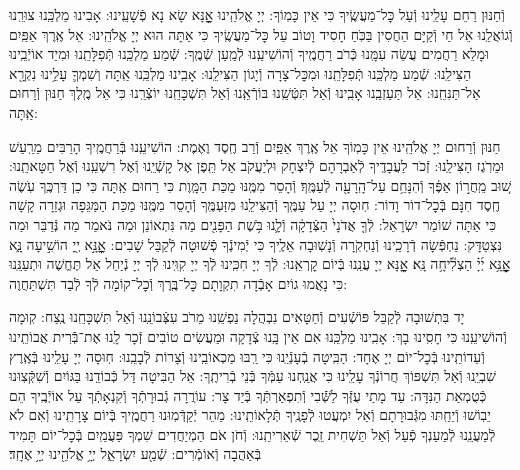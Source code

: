 \documentclass[twoside, openany, parskip=half, 11pt]{book}
\begin{document}
וְֿחַנּוּן רַחֵם עָלֵֽינוּ וְֿעַל כׇּל־מַעֲשֶֽׂיךָ כִּי אֵין כָּמֽוֹךָ: יְיָ אֱלֹהֵֽינוּ אׇׇׇׇָנָּא שָׂא נָא פְֿשָׁעֵֽינוּ: אָבִינוּ מַלְכֵּֽנוּ צוּרֵֽנוּ וְֿגוֹאֲלֵֽנוּ אֵל חַי וְֿקַיָּם הַחֲסִין בַּכֹּֽחַ חָסִיד וָטוֹב עַל כׇּל־מַעֲשֶֽׂיךָ כִּי אַתָּה הוּא יְיָ אֱלֹהֵֽינוּ: אֵל אֶֽרֶךְ אַפַּֽיִם וּמָלֵא רַחֲמִים עֲשֵׂה עִמָּֽנוּ כְּֿרֹב רַחֲמֶֽיךָ וְֿהוֹשִׁיעֵֽנוּ לְֿמַֽעַן שְֿׁמֶֽךָ: שְֿׁמַע מַלְכֵּֽנוּ תְּֿפִלָּתֵֽנוּ וּמִיַד אוֹיְֿבֵֽינוּ הַצִּילֵֽנוּ: שְֿׁמַע מַלְכֵּֽנוּ תְּֿפִלָּתֵֽנוּ וּמִכׇּל־צָרָה וְֿיָגוֹן הַצִּילֵֽנוּ: אָבִֽינוּ מַלְכֵּֽנוּ אַֽתָּה וְשִׁמְךָ֛ עָלֵ֥ינוּ נִקְרָ֖א אַל־תַּנִּחֵֽנוּ: אַל תַּעַזְבֵֽנוּ אָבִֽינוּ וְֿאַל תִּטְּֿשֵֽׁנוּ בּוֹרְֿאֵֽנוּ וְֿאַל תִּשְׁכָּחֵֽנוּ יוֹצְֿרֵֽנוּ כִּי אֵל מֶֽלֶךְ חַנּוּן וְֿרַחוּם אַֽתָּה:



חַנּוּן וְֿרַחוּם יְיָ אֱלֹהֵֽינוּ אֵין כָּמֽוֹךָ אֵל אֶֽרֶךְ אַפַּֽיִם וְֿרַב חֶֽסֶד וֶאֶמֶת: הוֹשִׁיעֵֽנוּ בְּֿרַחֲמֶֽיךָ הָרַבִּים מֵרַֽעַשׁ וּמֵרֹֽגֶז הַצִּילֵֽנוּ: זְֿכֹר לַעֲבָדֶֽיךָ לְֿאַבְרָהָם לְֿיִצְחָק וּלְיַעֲקֹב אַל תֵּֽפֶן אֶל קָשְֿׁיֵֽנוּ וְֿאֶל רִשְׁעֵֽנוּ וְֿאֶל חַטָּאתֵֽנוּ:
שׁ֚וּב מֵֽחֲר֣וֹן אַפֶּ֔ךָ וְֿהִנָּחֵ֥ם עַל־הָֽרָעָ֖ה לְֿעַמֶּֽךָ׃ וְֿהָסֵר מִמֶּֽנּוּ מַכַּת הַמָּֽוֶת כִּי רַחוּם אַֽתָּה כִּי כֵן דַּרְכֶּֽךָ עֹֽשֶׂה חֶֽסֶד חִנָּם בְּֿכׇל־דוֹר וָדוֹר: חֽוּסָה יְיָ עַל עַמֶּֽךָ וְֿהַצִּילֵֽנוּ מִזַּעְמֶּֽךָ וְֿהָסֵר מִמֶּֽנּוּ מַכַּת הַמַּגֵּפָה וּגְזֵרָה קָשָׁה כִּי אַתָּה שׁוֹמֵר יִשְׂרָאֵל:
לְֿךָ֤ אֲדֹנָי֙ הַצְּֿדָקָ֔ה וְֿלָ֛נוּ בֹּ֥שֶׁת הַפָּנִ֖ים מַה נִּתְאוֹנֵן וּמַה נֹּאמַר מַה נְּֿדַבֵּר וּמַה נִּצְטַדָּק: נַחְפְּֿשָׂה דְֿרָכֵֽינוּ וְֿנַחְקֹֽרָה וְֿנָשֽׁוּבָה אֵלֶֽיךָ כִּי יְֿמִינְֿךָ פְֿשׁוּטָה לְֿקַבֵּל שָׁבִים:
אׇׇׇׇׇׇׇׇָֽנָּ֣א יְ֖יָ הוֹשִׁ֣יעָה נָּ֑א אׇׇׇׇׇׇׇׇָֽנָּ֥א יְ֜יָ֗ הַצְלִ֘יחָ֥ה נָּֽא׃ אׇׇׇׇָנָּא יְיָ עֲנֵֽנוּ בְּֿיוֹם קׇרְאֵֽנוּ: לְֿךָ יְיָ חִכִּֽינוּ לְֿךָ יְיָ קִוִּֽינוּ לְֿךָ יְיָ נְֿיַחֵל אַל תֶּחֱשֶׁה וּתְעַנֵּֽנוּ כִּי נָאֲמוּ גוֹיִם אָבְֿדָה תִקְוָתָם כׇּל־בֶּֽרֶךְ וְֿכׇל־קוֹמָה לְֿךָ לְֿבַד תִּשְׁתַּחֲוֶה:

יָד בִּתְשׁוּבָה לְֿקַבֵּל פּוֹשְֿׁעִים וְֿחַטָּאִים נִבְהֲלָה נַפְשֵֽׁנוּ מֵרֹב עִצְּֿבוֹנֵֽנוּ וְֿאַל תִּשְׁכָּחֵֽנוּ נֶֽצַח: קֽוּמָה וְֿהוֹשִׁיעֵֽנוּ כִּי חָסִֽינוּ בָךְ: אָבִֽינוּ מַלְכֵּֽנוּ אִם אֵין בָּֽנוּ צְֿדָקָה וּמַעֲשִׂים טוֹבִים זְֿכָר לָֽנוּ אֶת־בְּֿֿרִית אֲבוֹתֵֽינוּ וְֿעֵדוֹתֵֽינוּ בְּֿכׇל־יוֹם יְיָ אֶחָד: הַבִּֽיטָה בְֿעָנְֿיֵֽנוּ כִּי רַֽבּוּ מַכְאוֹבֵֽינוּ וְֿצָרוֹת לְֿבָבֵֽנוּ: חֽוּסָה יְיָ עָלֵֽינוּ בְּֿאֶֽרֶץ שִׁבְיֵֽנוּ וְֿאַל תִּשְׁפּוֹךְ חֲרוֹנְֿךָ עָלֵֽינוּ כִּי אֲנַֽחְנוּ עַמְּֿךָ בְּֿנֵי בְֿרִיתֶֽךָ: אֵל הַבִּיטָה דַּל כְּֿבוֹדֵֽנוּ בַּגּוֹיִם וְֿשִׁקְּֿצֽוּנוּ כְּֿטֻמְאַת הַנִּדָּה: עַד מָתַי עֻזְּֿךָ לַשְּֿֿׁבִי וְֿתִפְאַרְתְּֿךָ בְּֿיַד צָר: עוֹרֲרָה גְֿבוּרָתְֿךָ וְֿקִנְאָתְֿךָ עַל אוֹיְֿבֶֽיךָ הֵם יֵבֽוֹשׁוּ וְֿיֵחַֽתּוּ מִגְּֿבוּרָתָם וְֿאַל יִמְעֲטוּ לְֿפָנֶֽיךָ תְּֿלָאוֹתֵֽינוּ: מַהֵר יְֿקַדְּֿמֽוּנוּ רַחֲמֶֽיךָ בְּֿיוֹם צָרָתֵֽינוּ וְֿאִם לֹא לְֿמַעֲנֵֽנוּ לְֿמַעַנְךָ פְֿעַל וְֿאַל תַּשְׁחִית זֵֽכֶר שְֿׁאֵרִיתֵֽנוּ: וְֿחֹן אֹם הַמְיַחֲדִים שִׁמְךָ פַּעֲמַֽיִם בְּֿכׇל־יוֹם תָּמִיד בְּֿאַהֲבָה וְֿאוֹמְֿרִים:
שְֿׁמַ֖ע יִשְׂרָאֵ֑ל יְיָ֥ אֱלֹהֵ֖ינוּ יְיָ֥ אֶחָֽד׃
\end{document}
